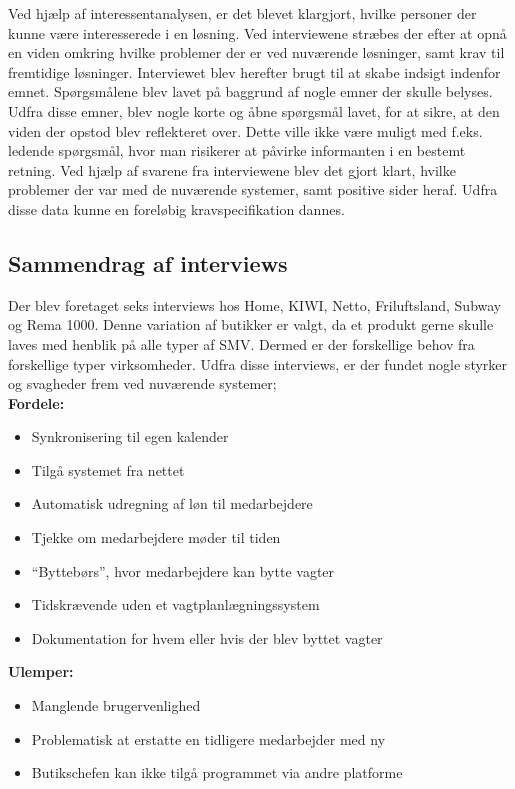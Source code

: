 Ved hjælp af interessentanalysen, er det blevet klargjort, hvilke personer der kunne være interesserede i en løsning. Ved interviewene stræbes der efter at opnå en viden omkring hvilke problemer der er ved nuværende løsninger, samt krav til fremtidige løsninger. Interviewet blev herefter brugt til at skabe indsigt indenfor emnet. Spørgsmålene blev lavet på baggrund af nogle emner der skulle belyses. Udfra disse emner, blev nogle korte og åbne spørgsmål lavet, for at sikre, at den viden der opstod blev reflekteret over. Dette ville ikke være muligt med f.eks. ledende spørgsmål, hvor man risikerer at påvirke informanten i en bestemt retning. Ved hjælp af svarene fra interviewene blev det gjort klart, hvilke problemer der var med de nuværende systemer, samt positive sider heraf. Udfra disse data kunne en foreløbig kravspecifikation dannes.
\\
\subsection{Sammendrag af interviews}
Der blev foretaget seks interviews hos Home, KIWI, Netto, Friluftsland, Subway og Rema 1000. Denne variation af butikker er valgt, da et produkt gerne skulle laves med henblik på alle typer af SMV. Dermed er der forskellige behov fra forskellige typer virksomheder. Udfra disse interviews, er der fundet nogle styrker og svagheder frem ved nuværende systemer;\\

\textbf{Fordele:}
\begin{itemize}
\setlength\itemsep{0.3em}
\item Synkronisering til egen kalender
\item Tilgå systemet fra nettet
\item Automatisk udregning af løn til medarbejdere
\item Tjekke om medarbejdere møder til tiden
\item “Byttebørs”, hvor medarbejdere kan bytte vagter
\item Tidskrævende uden et vagtplanlægningssystem
\item Dokumentation for hvem eller hvis der blev byttet vagter\\
\end{itemize}

\textbf{Ulemper:}
\begin{itemize}
\item Manglende brugervenlighed
\item Problematisk at erstatte en tidligere medarbejder med ny
\item Butikschefen kan ikke tilgå programmet via andre platforme
\end{itemize}

